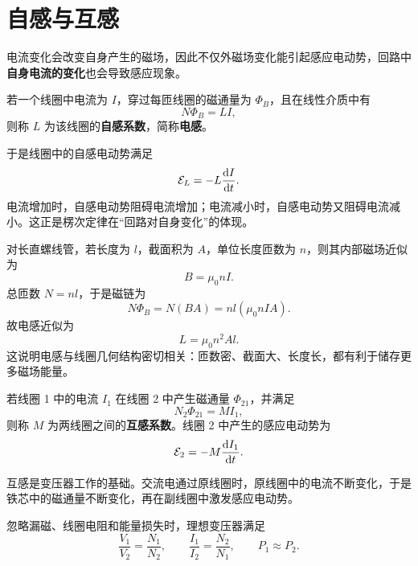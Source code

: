 \section{自感与互感}

电流变化会改变自身产生的磁场，因此不仅外磁场变化能引起感应电动势，回路中\textbf{自身电流的变化}也会导致感应现象。

\begin{definition}
若一个线圈中电流为 $I$，穿过每匝线圈的磁通量为 $\Phi_B$，且在线性介质中有
\[
N\Phi_B=LI,
\]
则称 $L$ 为该线圈的\textbf{自感系数}，简称\textbf{电感}。
\end{definition}

于是线圈中的自感电动势满足
\[
\mathcal{E}_L=-L\dv{I}{t}.
\]
电流增加时，自感电动势阻碍电流增加；电流减小时，自感电动势又阻碍电流减小。这正是楞次定律在“回路对自身变化”的体现。

对长直螺线管，若长度为 $l$，截面积为 $A$，单位长度匝数为 $n$，则其内部磁场近似为
\[
B=\mu_0 n I.
\]
总匝数 $N=nl$，于是磁链为
\[
N\Phi_B=N(BA)=nl(\mu_0 n I A).
\]
故电感近似为
\[
L=\mu_0 n^2 A l.
\]
这说明电感与线圈几何结构密切相关：匝数密、截面大、长度长，都有利于储存更多磁场能量。

\begin{definition}
若线圈 1 中的电流 $I_1$ 在线圈 2 中产生磁通量 $\Phi_{21}$，并满足
\[
N_2\Phi_{21}=M I_1,
\]
则称 $M$ 为两线圈之间的\textbf{互感系数}。线圈 2 中产生的感应电动势为
\[
\mathcal{E}_2=-M\dv{I_1}{t}.
\]
\end{definition}

互感是变压器工作的基础。交流电通过原线圈时，原线圈中的电流不断变化，于是铁芯中的磁通量不断变化，再在副线圈中激发感应电动势。

\begin{law}[理想变压器关系]
忽略漏磁、线圈电阻和能量损失时，理想变压器满足
\[
\frac{V_1}{V_2}=\frac{N_1}{N_2},
\qquad
\frac{I_1}{I_2}=\frac{N_2}{N_1},
\qquad
P_1\approx P_2.
\]
\end{law}

